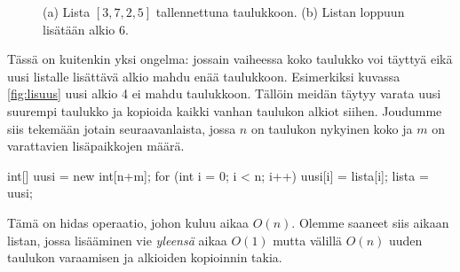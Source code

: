 \begin{figure}
\center
{}
\caption{(a) Lista $[3,7,2,5]$ tallennettuna taulukkoon. (b) Listan loppuun lisätään alkio 6.}
\label{fig:listau}
\end{figure}

Tässä on kuitenkin yksi ongelma: jossain vaiheessa koko taulukko
voi täyttyä eikä uusi listalle lisättävä alkio mahdu enää taulukkoon.
Esimerkiksi kuvassa \ref{fig:lisuus} uusi alkio 4 ei mahdu taulukkoon.
Tällöin meidän täytyy varata uusi suurempi taulukko ja
kopioida kaikki vanhan taulukon alkiot siihen.
Joudumme siis tekemään jotain seuraavanlaista,
jossa $n$ on taulukon nykyinen koko ja $m$ on varattavien
lisäpaikkojen määrä.

\begin{code}
int[] uusi = new int[n+m];
for (int i = 0; i < n; i++) {
    uusi[i] = lista[i];
}
lista = uusi;
\end{code}

Tämä on hidas operaatio, johon kuluu aikaa $O(n)$.
Olemme saaneet siis aikaan listan, jossa lisääminen vie
\emph{yleensä} aikaa $O(1)$ mutta välillä $O(n)$
uuden taulukon varaamisen ja alkioiden kopioinnin takia.

